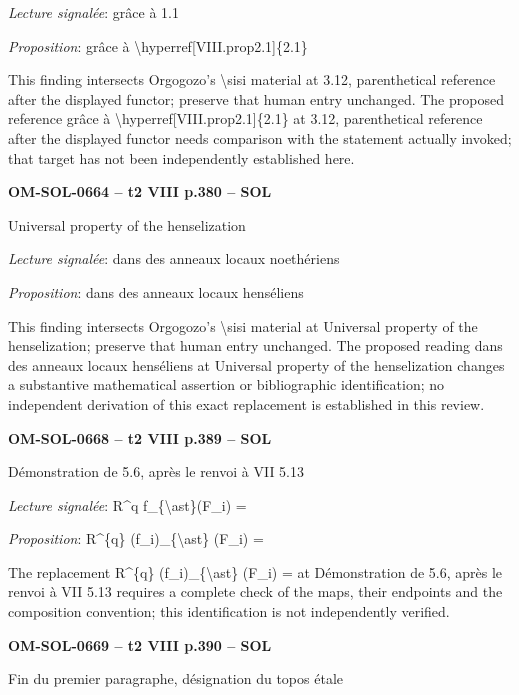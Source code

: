 \emph{Lecture signalée}: grâce à 1.1\par
\emph{Proposition}: grâce à \textbackslash{}hyperref[VIII.prop2.1]\{2.1\}\par
This finding intersects Orgogozo's \textbackslash{}sisi material at 3.12, parenthetical reference after the displayed functor; preserve that human entry unchanged. The proposed reference grâce à \textbackslash{}hyperref[VIII.prop2.1]\{2.1\} at 3.12, parenthetical reference after the displayed functor needs comparison with the statement actually invoked; that target has not been independently established here.\par
\par\noindent\textbf{OM-SOL-0664 -- t2 VIII p.380 -- SOL}\par
Universal property of the henselization\par
\emph{Lecture signalée}: dans des anneaux locaux noethériens\par
\emph{Proposition}: dans des anneaux locaux henséliens\par
This finding intersects Orgogozo's \textbackslash{}sisi material at Universal property of the henselization; preserve that human entry unchanged. The proposed reading dans des anneaux locaux henséliens at Universal property of the henselization changes a substantive mathematical assertion or bibliographic identification; no independent derivation of this exact replacement is established in this review.\par
\par\noindent\textbf{OM-SOL-0668 -- t2 VIII p.389 -- SOL}\par
Démonstration de 5.6, après le renvoi à VII 5.13\par
\emph{Lecture signalée}: R\textasciicircum{}q f\_\{\textbackslash{}ast\}(F\_i) =\par
\emph{Proposition}: R\textasciicircum{}\{q\} (f\_i)\_\{\textbackslash{}ast\} (F\_i) =\par
The replacement R\textasciicircum{}\{q\} (f\_i)\_\{\textbackslash{}ast\} (F\_i) = at Démonstration de 5.6, après le renvoi à VII 5.13 requires a complete check of the maps, their endpoints and the composition convention; this identification is not independently verified.\par
\par\noindent\textbf{OM-SOL-0669 -- t2 VIII p.390 -- SOL}\par
Fin du premier paragraphe, désignation du topos étale\par
